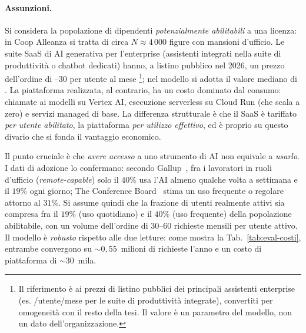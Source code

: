 \paragraph{Assunzioni.} Si considera la popolazione di dipendenti \emph{potenzialmente abilitabili} a una licenza: in Coop Alleanza si tratta di circa $N \approx 4\,000$ figure con mansioni d'ufficio. 
Le suite SaaS di AI generativa per l'enterprise
(assistenti integrati nella suite di produttività o chatbot dedicati) hanno, a listino pubblico nel 2026, un prezzo dell'ordine di --30 per utente al mese
\footnote{Il riferimento è ai prezzi di listino pubblici dei principali assistenti enterprise (es. /utente/mese per le suite di produttività integrate), 
convertiti per omogeneità con il resto della tesi. Il valore è un parametro del modello, non un dato dell'organizzazione.}; nel modello si adotta il valore mediano di .
La piattaforma realizzata, al contrario, ha un costo dominato dal consumo: chiamate ai modelli su Vertex AI,
esecuzione serverless su Cloud Run (che scala a zero) e servizi managed di base. 
La differenza strutturale è che il SaaS è tariffato \emph{per utente abilitato}, la piattaforma \emph{per utilizzo effettivo}, ed è proprio su questo divario
che si fonda il vantaggio economico.

Il punto cruciale è che \emph{avere accesso} a uno strumento di AI non equivale a \emph{usarlo}. I dati di adozione lo confermano: secondo Gallup~\cite{gallup2026aiwork},
fra i lavoratori in ruoli d'ufficio (\emph{remote-capable}) solo il $40\%$ usa l'AI almeno qualche volta a settimana e il $19\%$ ogni giorno;
The Conference Board~\cite{conferenceboard2023genai} stima un uso frequente o regolare attorno al $31\%$. Si assume quindi che la frazione di utenti realmente attivi sia compresa
fra il $19\%$ (uso quotidiano) e il $40\%$ (uso frequente) della popolazione abilitabile, con un volume dell'ordine di $30$--$60$ richieste mensili per utente attivo.
Il modello è \emph{robusto} rispetto alle due letture: come mostra la Tab.~\ref{tab:eval-costi}, entrambe convergono su $\sim0{,}55$~milioni di richieste l'anno
e un costo di piattaforma di $\sim$\texteuro$30$~mila.

